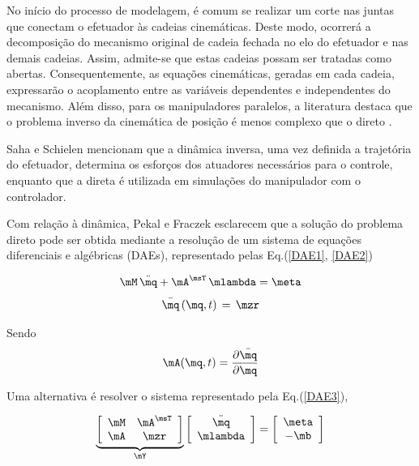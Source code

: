 \documentclass[]{politex}
\begin{document}
No início do processo de modelagem, é comum  se realizar um corte nas juntas que conectam o efetuador às cadeias cinemáticas. Deste modo, ocorrerá a decomposição do mecanismo original de cadeia fechada no elo do efetuador e nas demais cadeias. Assim, admite-se que estas cadeias possam ser tratadas como abertas. Consequentemente, as equações cinemáticas, geradas em cada cadeia, expressarão o acoplamento entre as variáveis dependentes e independentes do mecanismo. Além disso, para os manipuladores paralelos, a literatura destaca que o problema inverso da cinemática de posição é menos complexo que o direto \cite{Merlet}. 

Saha e Schielen \cite{Saha} mencionam que a dinâmica inversa, uma vez definida a trajetória do efetuador, determina os esforços dos atuadores necessários para o controle, enquanto que a direta é utilizada em simulações do manipulador com o controlador.

Com relação à dinâmica, Pekal e Fraczek \cite{Pekal2} esclarecem que a solução do problema direto pode ser obtida mediante a resolução de um sistema de equações diferenciais e algébricas (DAEs), representado pelas Eq.(\ref{DAE1}, \ref{DAE2})

\begin{equation}
\mM \, \ddot{\mq} + \mA^\msT \,\mlambda = \meta
\label{DAE1}
\end{equation}
%
\begin{equation}
\bar{\mq} \, (\mq,t) \, = \, \mzr
\label{DAE2}
\end{equation}

Sendo
\begin{equation}
\mA(\mq,t) = \frac{\partial \bar{\mq}}{\partial \mq}
\end{equation}

Uma alternativa é resolver o sistema representado pela Eq.(\ref{DAE3}), 

\begin{equation}
\underbrace{\left[ \begin{array}{cc}
\mM & \mA^\msT \\
\mA & \mzr
\end{array}
\right]}_{\mY}
\left[ \begin{array}{c}
\ddot{\mq} \\
\mlambda
\end{array}
\right] =
\left[ \begin{array}{c}
\meta \\
-\mb
\end{array}
\right]
\label{DAE3}
\end{equation}
\end{document}
